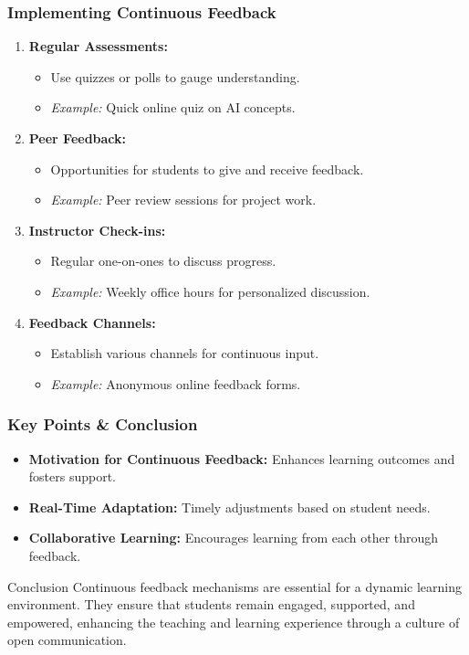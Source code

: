 \documentclass[aspectratio=169]{beamer}
\begin{document}
\begin{frame}[fragile]
    \frametitle{Implementing Continuous Feedback}
    \begin{enumerate}
        \item \textbf{Regular Assessments:}
        \begin{itemize}
            \item Use quizzes or polls to gauge understanding.
            \item \textit{Example:} Quick online quiz on AI concepts.
        \end{itemize}

        \item \textbf{Peer Feedback:}
        \begin{itemize}
            \item Opportunities for students to give and receive feedback.
            \item \textit{Example:} Peer review sessions for project work.
        \end{itemize}

        \item \textbf{Instructor Check-ins:}
        \begin{itemize}
            \item Regular one-on-ones to discuss progress.
            \item \textit{Example:} Weekly office hours for personalized discussion.
        \end{itemize}

        \item \textbf{Feedback Channels:}
        \begin{itemize}
            \item Establish various channels for continuous input.
            \item \textit{Example:} Anonymous online feedback forms.
        \end{itemize}
    \end{enumerate}
\end{frame}

\begin{frame}[fragile]
    \frametitle{Key Points & Conclusion}
    \begin{itemize}
        \item \textbf{Motivation for Continuous Feedback:} Enhances learning outcomes and fosters support.
        \item \textbf{Real-Time Adaptation:} Timely adjustments based on student needs.
        \item \textbf{Collaborative Learning:} Encourages learning from each other through feedback.
    \end{itemize}

    \begin{block}{Conclusion}
        Continuous feedback mechanisms are essential for a dynamic learning environment. They ensure that students remain engaged, supported, and empowered, enhancing the teaching and learning experience through a culture of open communication.
    \end{block}
\end{frame}
\end{document}
